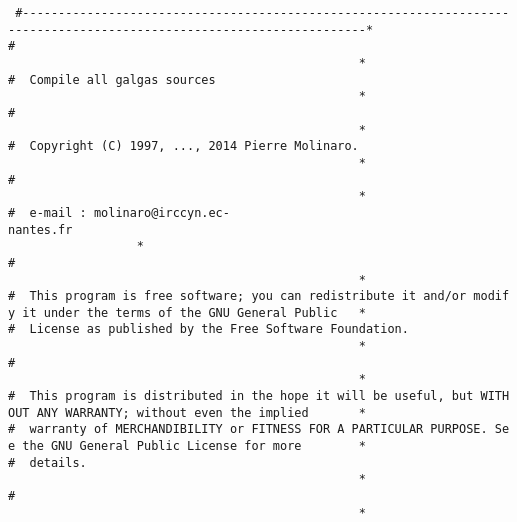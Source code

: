 \texttt{\small
\#-{}-{}-{}-{}-{}-{}-{}-{}-{}-{}-{}-{}-{}-{}-{}-{}-{}-{}-{}-{}-{}-{}-{}-{}-{}-{}-{}-{}-{}-{}-{}-{}-{}-{}-{}-{}-{}-{}-{}-{}-{}-{}-{}-{}-{}-{}-{}-{}-{}-{}-{}-{}-{}-{}-{}-{}-{}-{}-{}-{}-{}-{}-{}-{}-{}-{}-{}-{}-{}-{}-{}-{}-{}-{}-{}-{}-{}-{}-{}-{}-{}-{}-{}-{}-{}-{}-{}-{}-{}-{}-{}-{}-{}-{}-{}-{}-{}-{}-{}-{}-{}-{}-{}-{}-{}-{}-{}-{}-{}-{}-{}-{}-{}-{}-{}-{}-{}-{}* \\
\#~~~~~~~~~~~~~~~~~~~~~~~~~~~~~~~~~~~~~~~~~~~~~~~~~~~~~~~~~~~~~~~~~~~~~~~~~~~~~~~~~~~~~~~~~~~~~~~~~~~~~~~~~~~~~~~~~~~~~~* \\
\#~~Compile~all~galgas~sources~~~~~~~~~~~~~~~~~~~~~~~~~~~~~~~~~~~~~~~~~~~~~~~~~~~~~~~~~~~~~~~~~~~~~~~~~~~~~~~~~~~~~~~~~~* \\
\#~~~~~~~~~~~~~~~~~~~~~~~~~~~~~~~~~~~~~~~~~~~~~~~~~~~~~~~~~~~~~~~~~~~~~~~~~~~~~~~~~~~~~~~~~~~~~~~~~~~~~~~~~~~~~~~~~~~~~~* \\
\#~~Copyright~(C)~1997,~...,~2014~Pierre~Molinaro.~~~~~~~~~~~~~~~~~~~~~~~~~~~~~~~~~~~~~~~~~~~~~~~~~~~~~~~~~~~~~~~~~~~~~~* \\
\#~~~~~~~~~~~~~~~~~~~~~~~~~~~~~~~~~~~~~~~~~~~~~~~~~~~~~~~~~~~~~~~~~~~~~~~~~~~~~~~~~~~~~~~~~~~~~~~~~~~~~~~~~~~~~~~~~~~~~~* \\
\#~~e-{}mail~:~molinaro@irccyn.ec-{}nantes.fr~~~~~~~~~~~~~~~~~~~~~~~~~~~~~~~~~~~~~~~~~~~~~~~~~~~~~~~~~~~~~~~~~~~~~~~~~~~~~~~* \\
\#~~~~~~~~~~~~~~~~~~~~~~~~~~~~~~~~~~~~~~~~~~~~~~~~~~~~~~~~~~~~~~~~~~~~~~~~~~~~~~~~~~~~~~~~~~~~~~~~~~~~~~~~~~~~~~~~~~~~~~* \\
\#~~This~program~is~free~software;~you~can~redistribute~it~and/or~modify~it~under~the~terms~of~the~GNU~General~Public~~~* \\
\#~~License~as~published~by~the~Free~Software~Foundation.~~~~~~~~~~~~~~~~~~~~~~~~~~~~~~~~~~~~~~~~~~~~~~~~~~~~~~~~~~~~~~~* \\
\#~~~~~~~~~~~~~~~~~~~~~~~~~~~~~~~~~~~~~~~~~~~~~~~~~~~~~~~~~~~~~~~~~~~~~~~~~~~~~~~~~~~~~~~~~~~~~~~~~~~~~~~~~~~~~~~~~~~~~~* \\
\#~~This~program~is~distributed~in~the~hope~it~will~be~useful,~but~WITHOUT~ANY~WARRANTY;~without~even~the~implied~~~~~~~* \\
\#~~warranty~of~MERCHANDIBILITY~or~FITNESS~FOR~A~PARTICULAR~PURPOSE.~See~the~GNU~General~Public~License~for~more~~~~~~~~* \\
\#~~details.~~~~~~~~~~~~~~~~~~~~~~~~~~~~~~~~~~~~~~~~~~~~~~~~~~~~~~~~~~~~~~~~~~~~~~~~~~~~~~~~~~~~~~~~~~~~~~~~~~~~~~~~~~~~* \\
\#~~~~~~~~~~~~~~~~~~~~~~~~~~~~~~~~~~~~~~~~~~~~~~~~~~~~~~~~~~~~~~~~~~~~~~~~~~~~~~~~~~~~~~~~~~~~~~~~~~~~~~~~~~~~~~~~~~~~~~* \\
}
